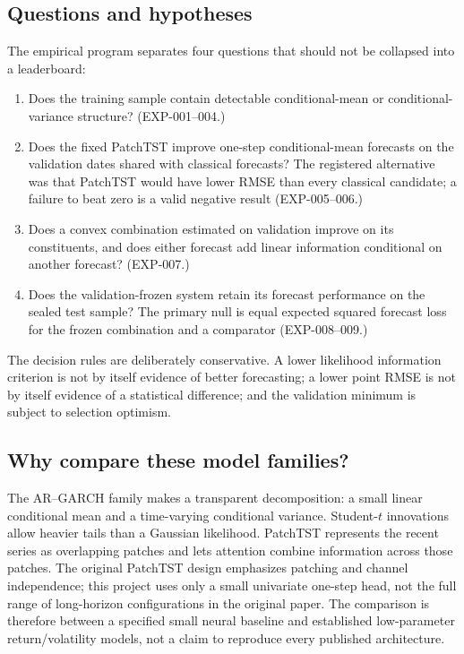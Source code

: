\documentclass[11pt,a4paper]{article}
\begin{document}
\subsection{Questions and hypotheses}
The empirical program separates four questions that should not be collapsed into a leaderboard:
\begin{enumerate}
\item Does the training sample contain detectable conditional-mean or conditional-variance
   structure? (EXP-001--004.)
\item Does the fixed PatchTST improve one-step conditional-mean forecasts on the validation
   dates shared with classical forecasts? The registered alternative was that PatchTST would
   have lower RMSE than every classical candidate; a failure to beat zero is a valid negative
   result (EXP-005--006.)
\item Does a convex combination estimated on validation improve on its constituents, and does
   either forecast add linear information conditional on another forecast? (EXP-007.)
\item Does the validation-frozen system retain its forecast performance on the sealed test
   sample? The primary null is equal expected squared forecast loss for the frozen combination
   and a comparator (EXP-008--009.)
\end{enumerate}
The decision rules are deliberately conservative. A lower likelihood information criterion is
not by itself evidence of better forecasting; a lower point RMSE is not by itself evidence of a
statistical difference; and the validation minimum is subject to selection optimism.

\subsection{Why compare these model families?}
The AR--GARCH family makes a transparent decomposition: a small linear conditional mean and a
time-varying conditional variance. Student-$t$ innovations allow heavier tails than a Gaussian
likelihood. PatchTST represents the recent series as overlapping patches and lets attention
combine information across those patches. The original PatchTST design emphasizes patching and
channel independence; this project uses only a small univariate one-step head, not the full range
of long-horizon configurations in the original paper. The comparison is therefore between a
specified small neural baseline and established low-parameter return/volatility models, not a
claim to reproduce every published architecture.
\end{document}
